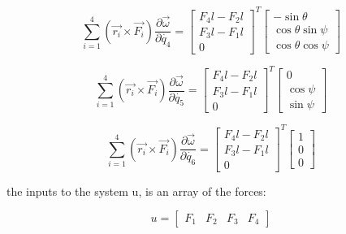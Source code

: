 \documentclass{article}
\begin{document}
\begin{equation}
\sum_{i=1}^{4}(\overrightarrow{r_{i}}\times\overrightarrow{F_{i}}) \frac{\partial\overrightarrow{\omega}}{\partial\dot{q_{4}}} =
\left[\begin{array}{c} F_4 l -F_2 l \\ F_3 l - F_1 l \\ 0\end{array}\right]^{T} \left[\begin{array}{c} -\sin{\theta} \\ \cos{\theta}\sin{\psi} \\ \cos{\theta}\cos{\psi} \end{array}\right]
\end{equation}

\begin{equation}
\sum_{i=1}^{4}(\overrightarrow{r_{i}}\times\overrightarrow{F_{i}}) \frac{\partial\overrightarrow{\omega}}{\partial\dot{q_{5}}} =
\left[\begin{array}{c} F_4 l -F_2 l \\ F_3 l - F_1 l \\ 0\end{array}\right]^{T} \left[\begin{array}{c} 0 \\ \cos{\psi} \\ \sin{\psi} \end{array}\right]
\end{equation}

\begin{equation}
\sum_{i=1}^{4}(\overrightarrow{r_{i}}\times\overrightarrow{F_{i}}) \frac{\partial\overrightarrow{\omega}}{\partial\dot{q_{6}}} =
\left[\begin{array}{c} F_4 l -F_2 l \\ F_3 l - F_1 l \\ 0\end{array}\right]^{T} \left[\begin{array}{c} 1 \\ 0 \\ 0\end{array}\right]
\end{equation}


the inputs to the system u, is an array of the forces:

\begin{equation}
u = [\begin{array}{cccc}
F_1 & F_2 & F_3 & F_4\end{array}]
\end{equation}
\end{document}

